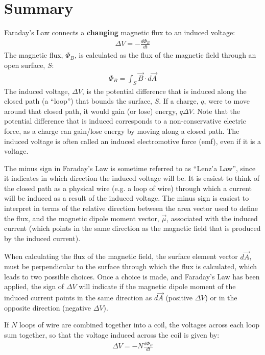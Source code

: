 \newpage
\section{Summary}

\begin{chapterSummary}
Faraday's Law connects a \textbf{changing} magnetic flux to an induced voltage:
\begin{align*}
\Delta V = -\frac{d\Phi_B}{dt}
\end{align*}
The magnetic flux, $\Phi_B$, is calculated as the flux of the magnetic field through an open surface, $S$:
\begin{align*}
\Phi_B = \int_S \vec B\cdot d\vec A
\end{align*}
The induced voltage, $\Delta V$, is the potential difference that is induced along the closed path (a ``loop'') that bounds the surface, $S$. If a charge, $q$, were to move around that closed path, it would gain (or lose) energy, $q\Delta V$. Note that the potential difference that is induced corresponds to a non-conservative electric force, as a charge can gain/lose energy by moving along a closed path. The induced voltage is often called an induced electromotive force (emf), even if it is a voltage.

The minus sign in Faraday's Law is sometime referred to as ``Lenz'a Law'', since it indicates in which direction the induced voltage will be. It is easiest to think of the closed path as a physical wire (e.g. a loop of wire) through which a current will be induced as a result of the induced voltage. The minus sign is easiest to interpret in terms of the relative direction between the area vector used to define the flux, and the magnetic dipole moment vector, $\vec \mu$, associated with the induced current (which points in the same direction as the magnetic field that is produced by the induced current). 

When calculating the flux of the magnetic field, the surface element vector $d\vec A$, must be perpendicular to the surface through which the flux is calculated, which leads to two possible choices. Once a choice is made, and Faraday's Law has been applied, the sign of $\Delta V$ will indicate if the magnetic dipole moment of the induced current points in the same direction as $d\vec A$ (positive $\Delta V$) or in the opposite direction (negative $\Delta V$).

If $N$ loops of wire are combined together into a coil, the voltages across each loop sum together, so that the voltage induced across the coil is given by:
\begin{align*}
\Delta V = -N\frac{d\Phi_B}{dt}
\end{align*}


\end{chapterSummary}
